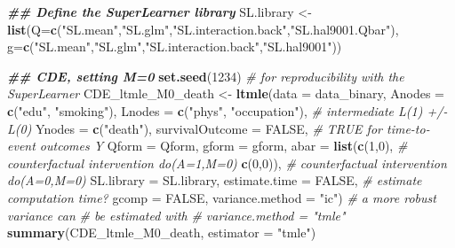 \documentclass[
]{book}
\newenvironment{Shaded}{\begin{snugshade}}{\end{snugshade}}
\newcommand{\AttributeTok}[1]{\textcolor[rgb]{0.13,0.29,0.53}{#1}}
\newcommand{\CommentTok}[1]{\textcolor[rgb]{0.56,0.35,0.01}{\textit{#1}}}
\newcommand{\ConstantTok}[1]{\textcolor[rgb]{0.56,0.35,0.01}{#1}}
\newcommand{\DecValTok}[1]{\textcolor[rgb]{0.00,0.00,0.81}{#1}}
\newcommand{\DocumentationTok}[1]{\textcolor[rgb]{0.56,0.35,0.01}{\textbf{\textit{#1}}}}
\newcommand{\FunctionTok}[1]{\textcolor[rgb]{0.13,0.29,0.53}{\textbf{#1}}}
\newcommand{\NormalTok}[1]{#1}
\newcommand{\OtherTok}[1]{\textcolor[rgb]{0.56,0.35,0.01}{#1}}
\newcommand{\StringTok}[1]{\textcolor[rgb]{0.31,0.60,0.02}{#1}}
\begin{document}
\begin{Shaded}
\begin{Highlighting}[]
\DocumentationTok{\#\# Define the SuperLearner library}
\NormalTok{SL.library }\OtherTok{\textless{}{-}} \FunctionTok{list}\NormalTok{(}\AttributeTok{Q=}\FunctionTok{c}\NormalTok{(}\StringTok{"SL.mean"}\NormalTok{,}\StringTok{"SL.glm"}\NormalTok{,}\StringTok{"SL.interaction.back"}\NormalTok{,}\StringTok{"SL.hal9001.Qbar"}\NormalTok{),}
                   \AttributeTok{g=}\FunctionTok{c}\NormalTok{(}\StringTok{"SL.mean"}\NormalTok{,}\StringTok{"SL.glm"}\NormalTok{,}\StringTok{"SL.interaction.back"}\NormalTok{,}\StringTok{"SL.hal9001"}\NormalTok{))}


\DocumentationTok{\#\# CDE, setting M=0}
\FunctionTok{set.seed}\NormalTok{(}\DecValTok{1234}\NormalTok{) }\CommentTok{\# for reproducibility with the SuperLearner}
\NormalTok{CDE\_ltmle\_M0\_death }\OtherTok{\textless{}{-}} \FunctionTok{ltmle}\NormalTok{(}\AttributeTok{data =}\NormalTok{ data\_binary,}
                            \AttributeTok{Anodes =} \FunctionTok{c}\NormalTok{(}\StringTok{"edu"}\NormalTok{, }\StringTok{"smoking"}\NormalTok{),}
                            \AttributeTok{Lnodes =} \FunctionTok{c}\NormalTok{(}\StringTok{"phys"}\NormalTok{, }
                                       \StringTok{"occupation"}\NormalTok{), }\CommentTok{\# intermediate L(1) +/{-} L(0)}
                            \AttributeTok{Ynodes =} \FunctionTok{c}\NormalTok{(}\StringTok{"death"}\NormalTok{),}
                            \AttributeTok{survivalOutcome =} \ConstantTok{FALSE}\NormalTok{, }\CommentTok{\# TRUE for time{-}to{-}event outcomes Y}
                            \AttributeTok{Qform =}\NormalTok{ Qform,}
                            \AttributeTok{gform =}\NormalTok{ gform,}
                            \AttributeTok{abar =} \FunctionTok{list}\NormalTok{(}\FunctionTok{c}\NormalTok{(}\DecValTok{1}\NormalTok{,}\DecValTok{0}\NormalTok{), }\CommentTok{\# counterfactual intervention do(A=1,M=0)}
                                        \FunctionTok{c}\NormalTok{(}\DecValTok{0}\NormalTok{,}\DecValTok{0}\NormalTok{)), }\CommentTok{\# counterfactual intervention do(A=0,M=0)}
                            \AttributeTok{SL.library =}\NormalTok{ SL.library,}
                            \AttributeTok{estimate.time =} \ConstantTok{FALSE}\NormalTok{, }\CommentTok{\# estimate computation time?}
                            \AttributeTok{gcomp =} \ConstantTok{FALSE}\NormalTok{,}
                            \AttributeTok{variance.method =} \StringTok{"ic"}\NormalTok{) }\CommentTok{\# a more robust variance can}
                                                    \CommentTok{\# be estimated with}
                                                    \CommentTok{\# variance.method = "tmle"}
\FunctionTok{summary}\NormalTok{(CDE\_ltmle\_M0\_death, }\AttributeTok{estimator =} \StringTok{"tmle"}\NormalTok{)}
\end{Highlighting}
\end{Shaded}
\end{document}
